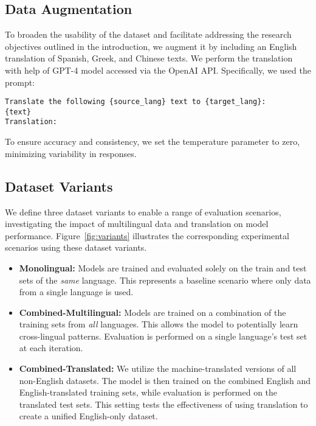 \subsection{Data Augmentation}

To broaden the usability of the dataset and facilitate addressing the research objectives outlined in the introduction, we augment it by including an English translation of Spanish, Greek, and Chinese texts.
We perform the translation with help of GPT-4 model accessed via the OpenAI API. Specifically, we used the prompt: 
\begin{small}
\begin{verbatim}
Translate the following {source_lang} text to {target_lang}: 
{text}
Translation:
\end{verbatim}
\end{small}
To ensure accuracy and consistency, we set the temperature parameter to zero, minimizing variability in responses.




\subsection{Dataset Variants}
\label{sec:dataset:variants}

We define three dataset variants to enable a range of evaluation scenarios, investigating the impact of multilingual data and translation on model performance. Figure~\ref{fig:variants} illustrates the corresponding experimental scenarios using these dataset variants.

\begin{itemize}
    \item \textbf{Monolingual:} Models are trained and evaluated solely on the train and test sets of the \emph{same} language. This represents a baseline scenario where only data from a single language is used.

    \item \textbf{Combined-Multilingual:}  Models are trained on a combination of the training sets from 
    \emph{all} languages.  This allows the model to potentially learn cross-lingual patterns.  Evaluation is performed on a single language's test set at each iteration.

    \item \textbf{Combined-Translated:} We utilize the machine-translated versions of all non-English datasets. The model is then trained on the combined English and English-translated training sets, while evaluation is performed on the translated test sets. This setting tests the effectiveness of using translation to create a unified English-only dataset.
\end{itemize}




